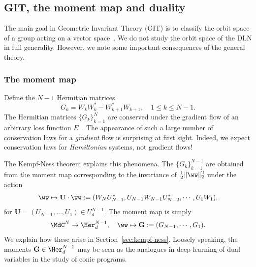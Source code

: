 

\subsection{GIT, the moment map and duality}
\label{subsec:GIT}
The main goal in Geometric Invariant Theory (GIT) is to classify the orbit space of a group acting on a vector space~\cite{Mumford-Fogarty}. We do not study the orbit space of the DLN in full generality. However, we note some important consequences of the general theory.



\subsubsection{The moment map}
Define the $N-1$ Hermitian matrices
\begin{equation}
    \label{eq:def-G} G_k = W_kW_k^* - W_{k+1}^*W_{k+1}, \quad 1\leq k \leq N-1.
\end{equation}
The Hermitian matrices $\{G_k\}_{k=1}^N$ are conserved under the gradient flow of an arbitrary loss function $E$~\cite[Theorem 2]{MY-dln}. The appearance of such a large number of conservation laws for a {\em gradient\/} flow is surprising at first sight. Indeed, we expect conservation laws for {\em Hamiltonian\/} systems, not gradient flows!   

The Kempf-Ness theorem explains this phenomena. The $\{G_k\}_{k=1}^{N-1}$ are obtained from the moment map corresponding to the invariance of $\tfrac{1}{2}\|\ww\|_2^2$ under the action
\begin{equation}
    \label{eq:moment1} \ww \mapsto \mathbf{U}\cdot \ww : = (W_N U_{N-1}^*,U_{N-1} W_{N-1} U_{N-2}^*,\cdots, U_1 W_1),
\end{equation} 
for $\mathbf{U}=(U_{N-1},\ldots, U_1) \in U_d^{N-1}$. The moment map is simply
\begin{equation}
    \label{eq:moment2}
    \MdC^N \to \Her_d^{N-1}, \quad \ww \mapsto \mathbf{G}:=(G_{N-1},\cdots,G_1).
\end{equation}
We explain how these arise in Section~\ref{sec:kempf-ness}. Loosely speaking, the moments $\mathbf{G}\in \Her_d^{N-1}$ may be seen as the analogues in deep learning of dual variables in the study of conic programs. 

